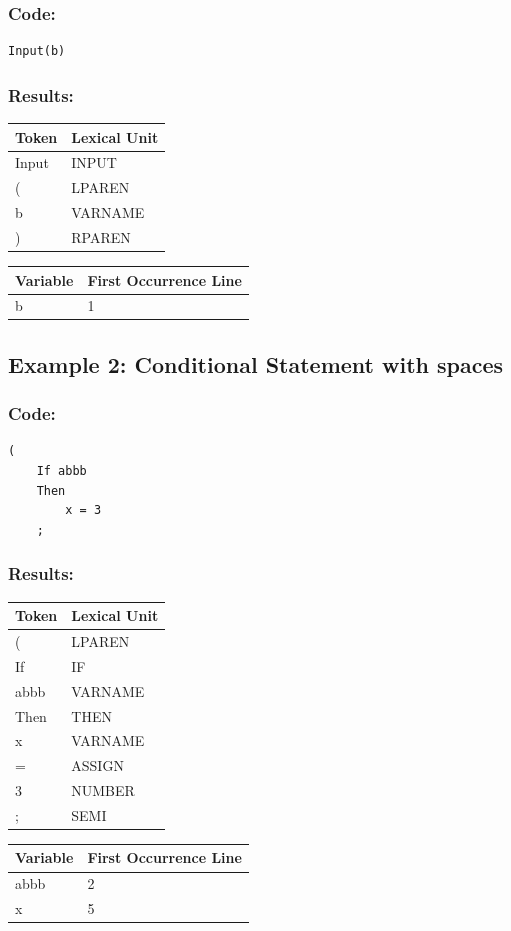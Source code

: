 \documentclass{article}
\begin{document}
\subsubsection{Code:}

\begin{verbatim}
Input(b)
\end{verbatim}

\subsubsection{Results:}

\begin{longtable}{p{6cm}p{5cm}}
\textbf{Token} & \textbf{Lexical Unit} \\
\hline
Input & INPUT \\
( & LPAREN \\
b & VARNAME \\
) & RPAREN \\
\end{longtable}

\begin{longtable}{p{6cm}p{5cm}}
\textbf{Variable} & \textbf{First Occurrence Line} \\
\hline
b & 1 \\
\end{longtable}

\subsection*{Example 2: Conditional Statement with spaces}

\subsubsection{Code:}

\begin{verbatim}
(
    If abbb
    Then
        x = 3
    ;
\end{verbatim}

\subsubsection{Results:}

\begin{longtable}{p{6cm}p{5cm}}
\textbf{Token} & \textbf{Lexical Unit} \\
\hline
( & LPAREN \\
If & IF \\
abbb & VARNAME \\
Then & THEN \\
x & VARNAME \\
= & ASSIGN \\
3 & NUMBER \\
; & SEMI \\
\end{longtable}

\begin{longtable}{p{6cm}p{5cm}}
\textbf{Variable} & \textbf{First Occurrence Line} \\
\hline
abbb & 2 \\
x & 5 \\
\end{longtable}
\end{document}
